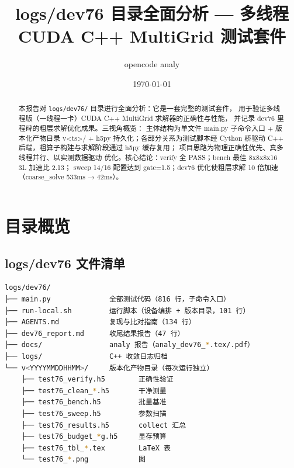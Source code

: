 \documentclass[UTF8]{ctexart}
\title{logs/dev76 目录全面分析 --- 多线程 CUDA C++ MultiGrid 测试套件}
\author{opencode analy}
\date{\today}
\begin{document}
\maketitle

\begin{abstract}
本报告对 \texttt{logs/dev76/} 目录进行全面分析：它是一套完整的测试套件，
用于验证多线程版（一线程一卡）CUDA C++ MultiGrid 求解器的正确性与性能，
并记录 dev76 里程碑的粗层求解优化成果。三视角概览：
\textcolor{struct}{主体结构}为单文件 main.py 子命令入口 + 版本化产物目录
v<ts>/ + h5py 持久化；\textcolor{relation}{各部分关系}为测试脚本经 Cython
桥驱动 C++ 后端，粗算子构建与求解阶段通过 h5py 缓存复用；
\textcolor{idea}{项目思路}为物理正确性优先、真多线程并行、以实测数据驱动
优化。核心结论：verify 全 PASS；bench 最佳 8x8x8x16 3L 加速比 2.13；
sweep 14/16 配置达到 gate=1.5；dev76 优化使粗层求解 10 倍加速
（coarse\_solve 533ms → 42ms）。
\end{abstract}

\tableofcontents

\section{目录概览}
\subsection{logs/dev76 文件清单}
\begin{lstlisting}[language=bash]
logs/dev76/
├── main.py              全部测试代码（816 行，子命令入口）
├── run-local.sh         运行脚本（设备编排 + 版本目录，101 行）
├── AGENTS.md            复现与比对指南（134 行）
├── dev76_report.md      收尾结果报告（47 行）
├── docs/                analy 报告（analy_dev76_*.tex/.pdf）
├── logs/                C++ 收敛日志归档
└── v<YYYYMMDDHHMM>/     版本化产物目录（每次运行独立）
    ├── test76_verify.h5        正确性验证
    ├── test76_clean_*.h5       干净测量
    ├── test76_bench.h5         批量基准
    ├── test76_sweep.h5         参数扫描
    ├── test76_results.h5       collect 汇总
    ├── test76_budget_*g.h5     显存预算
    ├── test76_tbl_*.tex        LaTeX 表
    └── test76_*.png            图
\end{lstlisting}
\end{document}
